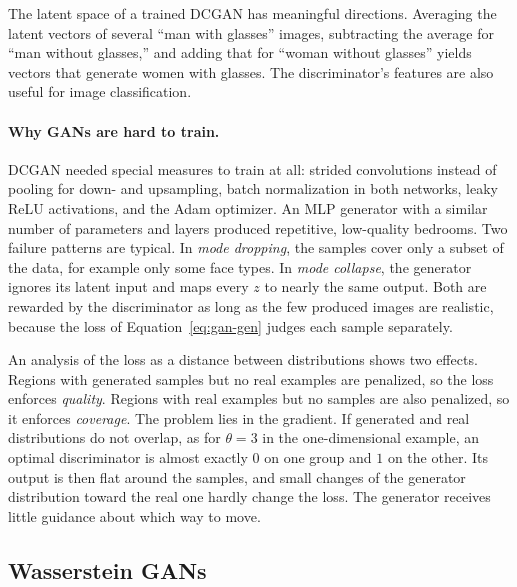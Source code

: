 \noindent
The latent space of a trained DCGAN has meaningful directions. Averaging the
latent vectors of several ``man with glasses'' images, subtracting the average
for ``man without glasses,'' and adding that for ``woman without glasses''
yields vectors that generate women with glasses. The discriminator's features
are also useful for image classification.

\paragraph{Why GANs are hard to train.}
DCGAN needed special measures to train at all: strided convolutions instead of
pooling for down- and upsampling, batch normalization in both networks, leaky
ReLU activations, and the Adam optimizer. An MLP generator with a similar
number of parameters and layers produced repetitive, low-quality bedrooms.
Two failure patterns are typical. In \emph{mode dropping}, the samples cover
only a subset of the data, for example only some face types. In \emph{mode
collapse}, the generator ignores its latent input and maps every $z$ to nearly
the same output. Both are rewarded by the discriminator as long as the few
produced images are realistic, because the loss of Equation~\ref{eq:gan-gen}
judges each sample separately.

An analysis of the loss as a distance between distributions shows two effects.
Regions with generated samples but no real examples are penalized, so the loss
enforces \emph{quality}. Regions with real examples but no samples are also
penalized, so it enforces \emph{coverage}. The problem lies in the gradient.
If generated and real distributions do not overlap, as for $\theta=3$ in the
one-dimensional example, an optimal discriminator is almost exactly $0$ on one
group and $1$ on the other. Its output is then flat around the samples, and
small changes of the generator distribution toward the real one hardly change
the loss. The generator receives little guidance about which way to move.

\subsection{Wasserstein GANs}

